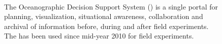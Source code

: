 \begin{figure}
\centering
{}\\
\caption{\small The Oceanographic Decision Support System (\od) is a
  single portal for planning, visualization, situational awareness,
  collaboration and archival of information before, during and after
  field experiments. The \od has been used since mid-year 2010 for
  \can field experiments.}
\label{fig:odss}
\end{figure}

